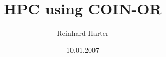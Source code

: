 \documentclass[a4paper, 11pt, twoside]{report}
\title{HPC using COIN-OR}
\author{Reinhard Harter}
\date{10.01.2007}
\begin{document}
\tableofcontents









\printglossary

\end{document}
